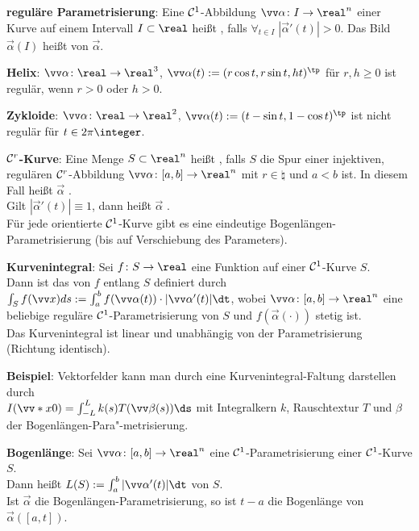 \textbf{reguläre Parametrisierung}:
Eine $\mathcal{C}^1$-Abbildung $\vec{\alpha}\colon I \to \real^n$ einer Kurve
auf einem Intervall $I \subset \real$ heißt , falls
$\forall_{t \in I}\; |\vec{\alpha}'(t)| > 0$.
Das Bild $\vec{\alpha}(I)$ heißt  von $\vec{\alpha}$.

\textbf{Helix}:
$\vec{\alpha}\colon \real \to \real^3$, $\vec{\alpha}(t) := (r \cos t, r \sin t, ht)^\tp$
für $r, h \ge 0$ ist regulär, wenn $r > 0$ oder $h > 0$.

\textbf{Zykloide}:
$\vec{\alpha}\colon \real \to \real^2$, $\vec{\alpha}(t) := (t - \sin t, 1 - \cos t)^\tp$
ist nicht regulär für $t \in 2\pi\integer$.

\textbf{$\mathcal{C}^r$-Kurve}:
Eine Menge $S \subset \real^n$ heißt , falls $S$ die Spur
einer injektiven, regulären $\mathcal{C}^r$-Abbildung $\vec{\alpha}\colon [a, b] \to \real^n$
mit $r \in \natural$ und $a < b$ ist.
In diesem Fall heißt $\vec{\alpha}$ .\\
Gilt $|\vec{\alpha}'(t)| \equiv 1$, dann heißt $\vec{\alpha}$
.\\
Für jede orientierte $\mathcal{C}^1$-Kurve gibt es eine eindeutige Bogenlängen-Parametrisierung
(bis auf Verschiebung des Parameters).

\linie

\textbf{Kurvenintegral}:
Sei $f\colon S \to \real$ eine Funktion auf einer $\mathcal{C}^1$-Kurve $S$.\\
Dann ist das  von $f$ entlang $S$ definiert durch
$\int_S f(\vec{x}) ds := \int_a^b f(\vec{\alpha}(t)) \cdot |\vec{\alpha}'(t)| \dt$,
wobei $\vec{\alpha}\colon [a, b] \to \real^n$ eine beliebige reguläre $\mathcal{C}^1$-Parametrisierung
von $S$ und $f(\vec{\alpha}(\cdot))$ stetig ist.\\
Das Kurvenintegral ist linear und unabhängig von der Parametrisierung
(Richtung identisch).

\textbf{Beispiel}:
Vektorfelder kann man durch eine Kurvenintegral-Faltung darstellen durch\\
$I(\vecs{x}{0}) = \int_{-L}^L k(s) T(\vec{\beta}(s)) \ds$ mit
Integralkern $k$, Rauschtextur $T$ und $\beta$ der Bogenlängen-Para"-metrisierung.

\linie

\textbf{Bogenlänge}:
Sei $\vec{\alpha}\colon [a, b] \to \real^n$ eine $\mathcal{C}^1$-Parametrisierung einer $\mathcal{C}^1$-Kurve $S$.\\
Dann heißt $L(S) := \int_a^b |\vec{\alpha}'(t)| \dt$  von $S$.\\
Ist $\vec{\alpha}$ die Bogenlängen-Parametrisierung, so ist
$t - a$ die Bogenlänge von $\vec{\alpha}([a, t])$.


